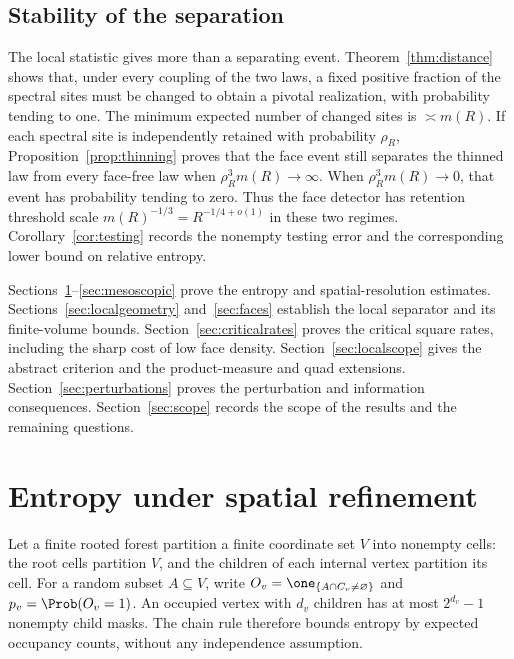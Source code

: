 \subsection{Stability of the separation}

The local statistic gives more than a separating event. Theorem~\ref{thm:distance} shows that, under every coupling of the two laws, a fixed positive fraction of the spectral sites must be changed to obtain a pivotal realization, with probability tending to one. The minimum expected number of changed sites is $\asymp m(R)$. If each spectral site is independently retained with probability $\rho_R$, Proposition~\ref{prop:thinning} proves that the face event still separates the thinned law from every face-free law when $\rho_R^3m(R)\to\infty$. When $\rho_R^3m(R)\to0$, that event has probability tending to zero. Thus the face detector has retention threshold scale $m(R)^{-1/3}=R^{-1/4+o(1)}$ in these two regimes. Corollary~\ref{cor:testing} records the nonempty testing error and the corresponding lower bound on relative entropy.

Sections~\ref{sec:forest}--\ref{sec:mesoscopic} prove the entropy and spatial-resolution estimates. Sections~\ref{sec:localgeometry} and~\ref{sec:faces} establish the local separator and its finite-volume bounds. Section~\ref{sec:criticalrates} proves the critical square rates, including the sharp cost of low face density. Section~\ref{sec:localscope} gives the abstract criterion and the product-measure and quad extensions. Section~\ref{sec:perturbations} proves the perturbation and information consequences. Section~\ref{sec:scope} records the scope of the results and the remaining questions.

\section{Entropy under spatial refinement}\label{sec:forest}

Let a finite rooted forest partition a finite coordinate set $V$ into
nonempty cells: the root cells partition $V$, and the children of each
internal vertex partition its cell. For a random subset $A\subseteq V$,
write $O_v=\one_{\{A\cap C_v\ne\varnothing\}}$ and $p_v=\Prob(O_v=1)$.
An occupied vertex with $d_v$ children has at most $2^{d_v}-1$ nonempty
child masks. The chain rule therefore bounds entropy by expected
occupancy counts, without any independence assumption.

